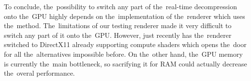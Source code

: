 To conclude, the~possibility to switch any part of the~real-time decompression onto the~GPU highly depends on the~implementation of the~renderer which uses the~method. The~limitations of our testing renderer made it very difficult to switch any part of it onto the~GPU. However, just recently has the~renderer switched to DirectX11 already supporting compute shaders which opens the~door for all the~alternatives impossible before. On the~other hand, the~GPU memory is currently the~main bottleneck, so sacrifying it for RAM could actually decrease the~overal performance.